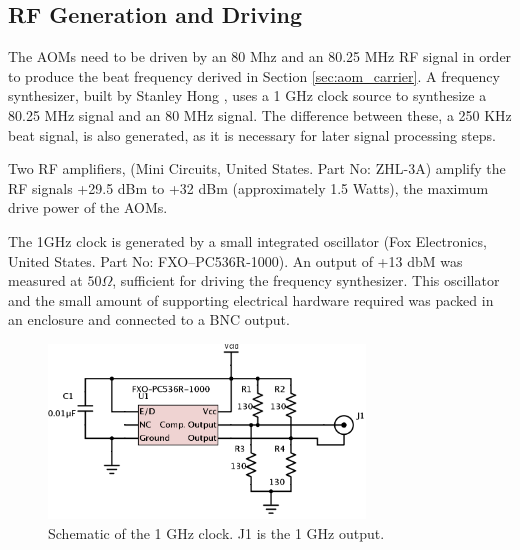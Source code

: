 
\subsection{RF Generation and Driving}

The AOMs need to be driven by an 80 Mhz and an 80.25 MHz RF signal in order to produce the beat frequency derived in Section \ref{sec:aom_carrier}. A frequency synthesizer, built by Stanley Hong \cite{hong}, uses a 1 GHz clock source to synthesize a 80.25 MHz signal and an 80 MHz signal. The difference between these, a 250 KHz beat signal, is also generated, as it is necessary for later signal processing steps.

Two RF amplifiers, (Mini Circuits, United States. Part No: ZHL-3A) amplify the RF signals +29.5 dBm to +32 dBm (approximately 1.5 Watts), the maximum drive power of the AOMs.

The 1GHz clock is generated by a small integrated oscillator (Fox Electronics, United States. Part No: FXO–PC536R-1000). An output of +13 dbM was measured at $50\Omega$, sufficient for driving the frequency synthesizer. This oscillator and the small amount of supporting electrical hardware required was packed in an enclosure and connected to a BNC output.

\begin{figure}[h!]
\centering
\includegraphics[width=0.75\textwidth]{Images/Schematics/1ghzclock_2.png}
\caption[Schematic of the 1Ghz clock.]{Schematic of the 1 GHz clock. J1 is the 1 GHz output.}
\end{figure}

